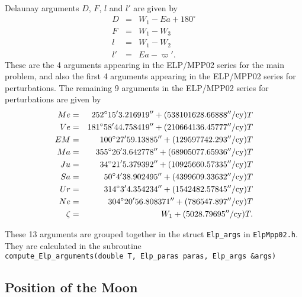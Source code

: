 \documentclass[12pt]{article}
\newcommand \beqn {\begin{eqnarray}}
\newcommand \eeqn {\end{eqnarray}}
\begin{document}
Delaunay arguments $D$, $F$, $l$ and $l'$ are given by 
\beqn
  D &=& W_1 - Ea + 180^\circ \\ 
  F &=& W_1-W_3 \\ 
  l &=& W_1-W_2 \\ 
  l' &=& Ea - \varpi' .
\eeqn
These are the 4 arguments appearing in the ELP/MPP02 series for the main problem, 
and also the first 4 arguments appearing in the ELP/MPP02 series for perturbations. 
The remaining 9 arguments in the ELP/MPP02 series for perturbations are given by 
\beqn
  Me &=& 252^\circ 15' 3.216919'' + (538101628.66888''/{\rm cy}) T \\ 
  Ve &=& 181^\circ 58' 44.758419'' + (210664136.45777''/{\rm cy}) T \\ 
  EM &=& 100^\circ 27' 59.13885'' + (129597742.293''/{\rm cy}) T \\
  Ma &=& 355^\circ 26' 3.642778'' + (68905077.65936''/{\rm cy}) T \\ 
  Ju &=& 34^\circ 21' 5.379392'' + (10925660.57335''/{\rm cy}) T \\ 
  Sa &=& 50^\circ 4' 38.902495'' + (4399609.33632''/{\rm cy}) T \\ 
  Ur &=& 314^\circ 3' 4.354234'' + (1542482.57845''/{\rm cy}) T \\
  Ne &=& 304^\circ 20' 56.808371'' + (786547.897''/{\rm cy}) T \\ 
  \zeta &=& W_1 + (5028.79695''/{\rm cy}) T .
\eeqn

These 13 arguments are grouped together in the struct {\tt Elp\_args} in 
{\tt ElpMpp02.h}. They are calculated in the subroutine \\
{\tt compute\_Elp\_arguments(double T, Elp\_paras paras, Elp\_args \&args)}

\subsection{Position of the Moon} 
\end{document}
